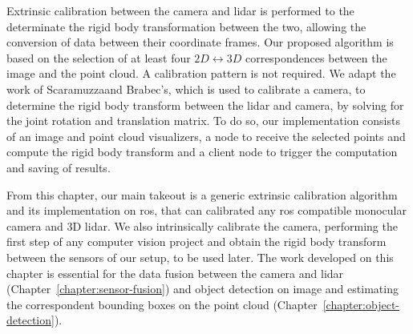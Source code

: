 Extrinsic calibration between the camera and \ac{lidar} is performed to the determinate the rigid body transformation between the two, allowing the conversion of data between their coordinate frames. Our proposed algorithm is based on the selection of at least four $2D \leftrightarrow 3D$ correspondences between the image and the point cloud. A calibration pattern is not required. We adapt the work of Scaramuzza\etal and Brabec's, which is used to calibrate a camera, to determine the rigid body transform between the \ac{lidar} and camera, by solving for the joint rotation and translation matrix. To do so, our implementation consists of an image and point cloud visualizers, a node to receive the selected points and compute the rigid body transform and a client node to trigger the computation and saving of results.

From this chapter, our main takeout is a generic extrinsic calibration algorithm and its implementation on \ac{ros}, that can calibrated any \ac{ros} compatible monocular camera and 3D \ac{lidar}. We also intrinsically calibrate the camera, performing the first step of any computer vision project and obtain the rigid body transform between the sensors of our setup, to be used later. The work developed on this chapter is essential for the data fusion between the camera and \ac{lidar} (Chapter~\ref{chapter:sensor-fusion}) and object detection on image and estimating the correspondent bounding boxes on the point cloud (Chapter~\ref{chapter:object-detection}).
